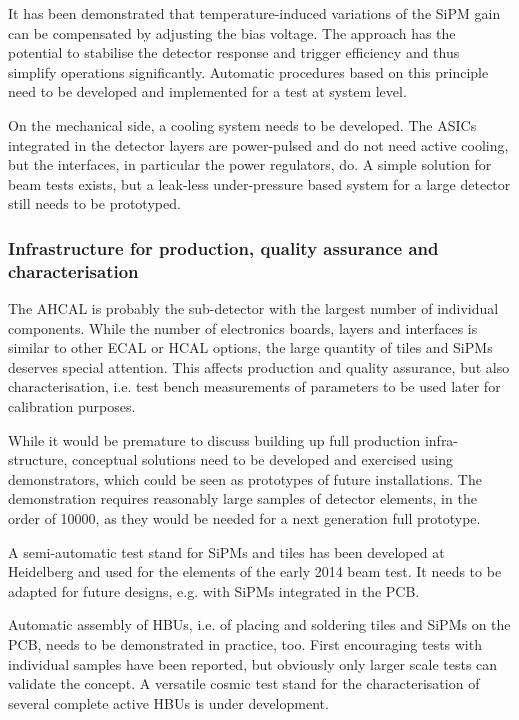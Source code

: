 It has been demonstrated that temperature-induced variations of the SiPM gain can be compensated by adjusting the bias voltage. The approach has the potential to stabilise the detector response and trigger efficiency and thus simplify operations significantly. Automatic procedures based on this principle need to be developed and implemented for a test at system level.

On the mechanical side, a cooling system needs to be developed. The ASICs integrated in the detector layers are power-pulsed and do not need active cooling, but the interfaces, in particular the power regulators, do. A simple solution for beam tests exists, but a leak-less under-pressure based system for a large detector still needs to be prototyped.

\subsubsection{Infrastructure for production, quality assurance and characterisation}

The AHCAL is probably the sub-detector with the largest number of individual components. While the number of electronics boards, layers and interfaces is similar to other ECAL or HCAL options, the large quantity of tiles and SiPMs deserves special attention. This affects production and quality assurance, but also characterisation, i.e. test bench measurements of parameters to be used later for calibration purposes.

While it would be premature to discuss building up full production infra-structure, conceptual solutions need to be developed and exercised using demonstrators, which could be seen as prototypes of future installations. The demonstration requires reasonably large samples of detector elements, in the order of 10000, as they would be needed for a next generation full prototype.

A semi-automatic test stand for SiPMs and tiles has been developed at Heidelberg and used for the elements of the early 2014 beam test. It needs to be adapted for future designs, e.g. with SiPMs integrated in the PCB.

Automatic assembly of HBUs, i.e. of placing and soldering tiles and SiPMs on the PCB, needs to be demonstrated in practice, too. First encouraging tests with individual samples have been reported, but obviously only larger scale tests can validate the concept. A versatile cosmic test stand for the characterisation of several complete active HBUs is under development.

